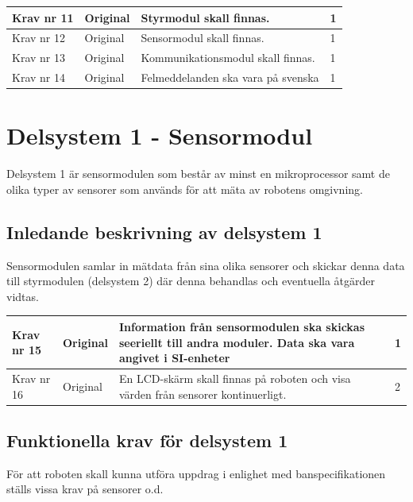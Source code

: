 \documentclass[11pt]{article}
\begin{document}
\begin{flushleft}
\begin{center}
\begin{longtable}{|l|l|p{.70\linewidth}|l|}
Krav nr 11 &
Original &
Styrmodul skall finnas. &
1 \\ \hline

Krav nr 12 &
Original &
Sensormodul skall finnas. &
1 \\ \hline

Krav nr 13 &
Original &
Kommunikationsmodul skall finnas. &
1 \\ \hline

Krav nr 14 &
Original &
Felmeddelanden ska vara på svenska &
1 \\ \hline
\end{longtable}
\end{center}

\pagebreak

\section{Delsystem 1 - Sensormodul}
Delsystem 1 är sensormodulen som består av minst en mikroprocessor samt de olika typer av sensorer som används för att mäta av robotens omgivning.


\subsection{Inledande beskrivning av delsystem 1}
Sensormodulen samlar in mätdata från sina olika sensorer och skickar denna data till styrmodulen (delsystem 2) där denna behandlas och eventuella åtgärder vidtas.

\begin{center}
\begin{longtable}{|l|l|p{.70\linewidth}|l|} \hline


Krav nr 15 & 
Original &
Information från sensormodulen ska skickas seeriellt till andra moduler. Data ska vara angivet i SI-enheter &
1 \\ \hline

Krav nr 16 &
Original &
En LCD-skärm skall finnas på roboten och visa värden från sensorer kontinuerligt. &
2 \\ \hline

\end{longtable}
\end{center}

\subsection{Funktionella krav för delsystem 1}
För att roboten skall kunna utföra uppdrag i enlighet med banspecifikationen ställs vissa krav på sensorer o.d.


\end{flushleft}
\end{document}
